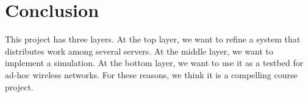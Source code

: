 \section{Conclusion}

This project has three layers. At the top layer, we want to refine a system that distributes work
among several servers. At the middle layer, we want to implement a simulation. At the bottom layer,
we want to use it as a testbed for ad-hoc wireless networks. For these reasons, we think it is a
compelling course project.
